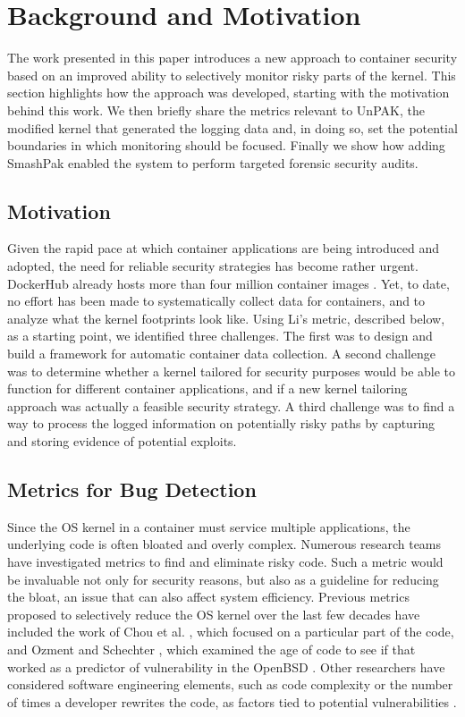 \section{Background and Motivation}
\label{sec.motivation}
The work presented in this paper introduces a new approach to container security based on an improved ability to selectively monitor risky parts of the kernel. 
This section highlights how the approach was developed, starting with the motivation behind this work. We then briefly share the metrics relevant to UnPAK, 
the modified kernel that generated the logging data and, in doing so, set the potential boundaries in which monitoring should be focused. 
Finally we show how adding SmashPak enabled the system to perform targeted forensic security audits.

\subsection{Motivation}
\label{sec.motivation.motivation}
Given the rapid pace at which container applications are being introduced and adopted, the need for reliable security strategies has become rather urgent. 
DockerHub already hosts more than four million container images \cite{DockerHub}. 
Yet, to date, no effort has been made to systematically collect data for containers, and to analyze what the kernel footprints look like. 
Using Li’s metric, described below, as a starting point,  we identified three challenges. The first was to design and build a framework for automatic container data collection.  
A second challenge was to determine whether a kernel tailored for security purposes would  be able to function for different container applications, 
and if a new kernel tailoring approach was actually a feasible security strategy. 
A third challenge was to find a way to process the logged information on potentially risky paths by capturing and storing evidence of potential exploits. 

\subsection{Metrics for Bug Detection}
\label{sec.motivation.metrics}
Since the OS kernel in a container must service multiple applications, the underlying code is often bloated and overly complex. 
Numerous research teams have investigated metrics to find and eliminate risky code. 
Such a metric would be invaluable not only for security reasons, but also as a guideline for reducing the bloat, an issue that can also affect system efficiency. 
Previous metrics proposed to selectively reduce the OS kernel over the last few decades have included the work of  Chou et al. \cite{Chou}, which focused on a particular part of the code, 
and Ozment and Schechter \cite{Ozment}, which examined the age of code to see if that worked as a predictor of vulnerability in the OpenBSD \cite{OpenBSD}. 
Other researchers have considered software engineering elements, such as code complexity or the number of times a developer rewrites the code, 
as factors tied to potential vulnerabilities \cite{5560680, SAC10, Imtiaz2018TowardsDV, 4459644, Alenezi2015EvaluatingSM}. 


